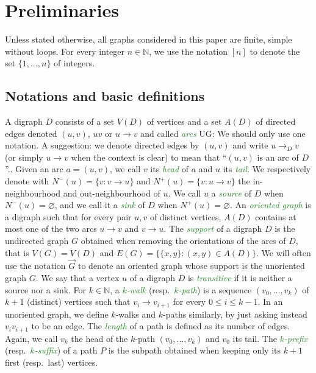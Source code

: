 \documentclass[11pt,a4aper]{article}
\renewcommand{\leq}{\leqslant}
\renewcommand{\emptyset}{\varnothing}
\DeclareRobustCommand*{\ora}{\overrightarrow}
\newcommand*{\orG}{\ora{G}}
\newcommand{\defin}[1]{\emph{\textcolor{ForestGreen}{#1}}}
\newcommand{\ugo}[1]{{\color{red} UG: #1}}
\begin{document}
\section{Preliminaries}
\label{sec:Prelis}
Unless stated otherwise, all graphs considered in this paper are finite, simple without loops. 
For every integer $n\in \mathbb N$, we use the notation $[n]$ to denote the set $\{1,\ldots,n\}$ of integers.
  
\subsection{Notations and basic definitions} A digraph $D$ consists of a set
$V(D)$ of vertices and a set $A(D)$ of directed edges denoted $(u,v)$, $uv$ or
$u \to v$ and called \defin{arcs} \ugo{We should only use one notation. A suggestion: we denote directed edges by $(u,v)$ and write $u\to_D v$ (or simply $u\to v$ when the context is clear) to mean that ``$(u,v)$ is an arc of $D$''.}. Given an arc $a=(u,v)$, we call $v$ its \defin{head} of
$a$ and $u$ its \defin{tail}. We respectively denote with
$N^-(u) = \{v \colon v \to u\}$ and $N^+(u) = \{v \colon u \to v\}$ the
in-neighbourhood and out-neighbourhood of $u$. We call $u$ a \defin{source} of $D$ when $N^-(u)=\emptyset$, and we call it a \defin{sink} of $D$ when $N^+(u)=\emptyset$.  An
\defin{oriented graph} is a digraph such that for every pair $u,v$ of distinct
vertices, $A(D)$ contains at most one of the two arcs $u\to v$ and $v\to u$. The
\defin{support} of a digraph $D$ is the undirected graph $G$ obtained when
removing the orientations of the arcs of $D$, that is $V(G) = V(D)$ and
$E(G) = \{\{x,y\} \colon (x,y) \in A(D)\}$. We will
often use the notation $\orG$ to denote an oriented graph whose support is the
unoriented graph $G$.  We say that a vertex $u$ of a digraph $D$ is
\defin{transitive} if it is neither a source nor a sink. For $k\in \mathbb N$, a
\defin{$k$-walk} (resp.\ \defin{$k$-path}) is a sequence $(v_0,\ldots, v_k)$ of
$k+1$ (distinct) vertices such that $v_i\to v_{i+1}$ for every $0\leq i\leq
k-1$. In an unoriented graph, we define $k$-walks and $k$-paths similarly, by just asking instead $v_iv_{i+1}$ to be an edge. The \defin{length} of a path is defined as its number of edges. Again, we
call $v_k$ the head of the $k$-path $(v_0,\ldots, v_k)$ and $v_0$ its tail. The
\defin{$k$-prefix} (resp.\ \defin{$k$-suffix}) of a path $P$ is the subpath
obtained when keeping only its $k+1$ first (resp.\ last) vertices. 
\end{document}
